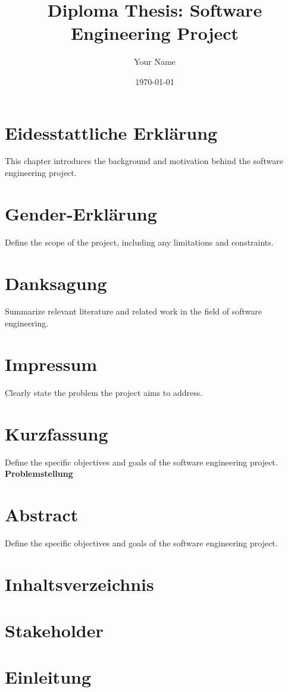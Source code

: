 \documentclass{report}
\title{Diploma Thesis: Software Engineering Project}
\author{Your Name}
\date{\today}
\begin{document}
\maketitle

\tableofcontents

\chapter{Eidesstattliche Erklärung}
This chapter introduces the background and motivation behind the software engineering project.

\chapter{Gender-Erklärung}
Define the scope of the project, including any limitations and constraints.

\chapter{Danksagung}
Summarize relevant literature and related work in the field of software engineering.

\chapter{Impressum}
Clearly state the problem the project aims to address.

\chapter{Kurzfassung}
Define the specific objectives and goals of the software engineering project.
\textbf{Problemstellung} 

\chapter{Abstract}
Define the specific objectives and goals of the software engineering project.

\chapter{Inhaltsverzeichnis}

\chapter{Stakeholder}

\chapter{Einleitung}
\end{document}
